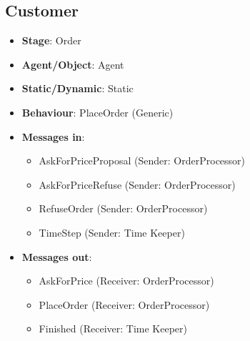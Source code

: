 \documentclass[12pt]{article}
\begin{document}
\subsection{Customer}%
\label{sub:customer_agent}
\begin{itemize}
    \item \textbf{Stage}: Order
    \item \textbf{Agent/Object}: Agent
    \item \textbf{Static/Dynamic}: Static
    \item \textbf{Behaviour}: PlaceOrder (Generic)
    \item \textbf{Messages in}:
        \begin{itemize}
            \item AskForPriceProposal (Sender: OrderProcessor)
            \item AskForPriceRefuse (Sender: OrderProcessor)
            \item RefuseOrder (Sender: OrderProcessor)
            \item TimeStep (Sender: Time Keeper)
        \end{itemize}
    \item \textbf{Messages out}:
        \begin{itemize}
            \item AskForPrice (Receiver: OrderProcessor)
            \item PlaceOrder (Receiver: OrderProcessor)
            \item Finished (Receiver: Time Keeper)
        \end{itemize}
\end{itemize}

\newpage{}
\end{document}
